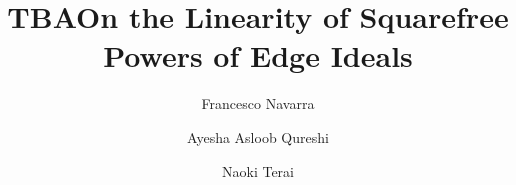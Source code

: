 \documentclass[12pt]{amsart}
\begin{document}
    \title[TBA]{TBA}


\title[On the Linearity of Squarefree Powers of Edge Ideals]{On the Linearity of Squarefree Powers of Edge Ideals}









	
    

\author[F. Navarra]{Francesco Navarra}      
\address[Francesco Navarra]{Sabanci University, Faculty of Engineering and Natural Sciences, Orta Mahalle, Tuzla 34956, Istanbul, Turkey}	

\author[A. A. Qureshi]{Ayesha Asloob Qureshi}      
\address[Ayesha Asloob Qureshi]{Sabanci University, Faculty of Engineering and Natural Sciences, Orta Mahalle, Tuzla 34956, Istanbul, Turkey}	

\author[N. Terai]{Naoki Terai}      
\address[Naoki Terai]{Department of Mathematics, Okayama University, 3-1-1 Tsushima-naka, Kita-ku, Okayama 700-8530, Japan}	
        
\end{document}
